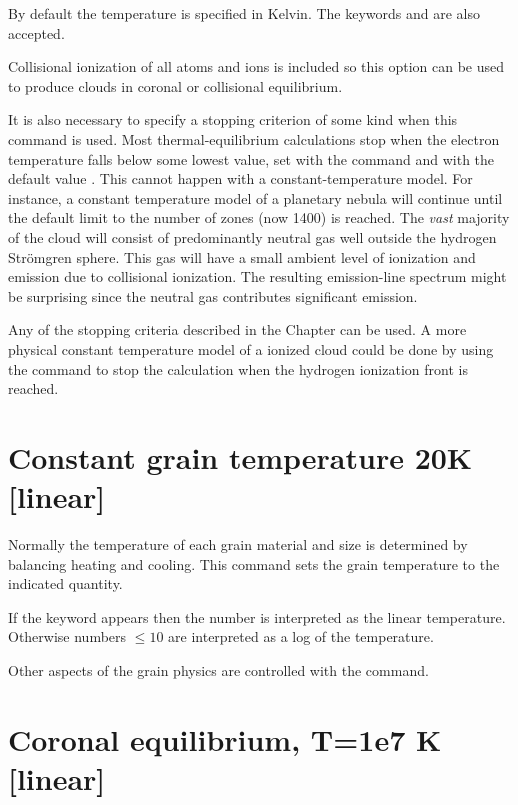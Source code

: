 By default the temperature is specified in Kelvin.
The keywords 
and  are also accepted.

Collisional ionization of all atoms and ions is included so this option
can be used to produce clouds in coronal or collisional equilibrium.

  It is also necessary to specify a
stopping criterion of some
kind when this command is used.
Most thermal-equilibrium calculations stop
when the electron temperature falls below some lowest value, set with the
 command and with the default
value \TEMPSTOPDEFAULT.
This cannot happen with a constant-temperature model.
For
instance, a constant temperature model of a planetary nebula will
continue
until the default limit to the number of zones (now 1400) is reached.
The
\emph{vast} majority of the cloud will consist of predominantly
neutral gas well outside the hydrogen Str\"omgren sphere.
This gas will have a small ambient
level of ionization and emission due to collisional ionization.
The
resulting emission-line spectrum might be surprising since the neutral gas
contributes significant emission.

Any of the stopping criteria described in the
Chapter  can be used.
A more physical constant
temperature model of a ionized cloud could be done by using the
 command to stop the calculation when the hydrogen
ionization front is reached.

\section{Constant grain temperature 20K [linear]}

Normally the temperature of each grain material and size is determined
by balancing heating and cooling.  This command sets the grain temperature
to the indicated quantity.

If the  keyword appears then the number
is interpreted as the linear temperature.
Otherwise numbers $\le 10$ are interpreted as a log
of the temperature.

Other aspects of the grain physics are controlled with the
 command.

\section{Coronal equilibrium, T=1e7 K [linear]}
\label{sec:CommandCoronalEquilibrium}

